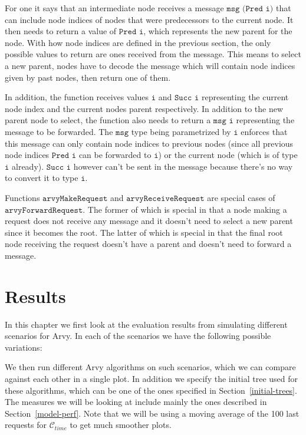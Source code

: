 \documentclass[a4paper, oneside]{discothesis}
\begin{document}
For one it says that an intermediate node receives a message $\texttt{msg (Pred i)}$ that can include node indices of nodes that were predecessors to the current node. It then needs to return a value of $\texttt{Pred i}$, which represents the new parent for the node. With how node indices are defined in the previous section, the only possible values to return are ones received from the message. This means to select a new parent, nodes have to decode the message which will contain node indices given by past nodes, then return one of them.

In addition, the function receives values $\texttt{i}$ and $\texttt{Succ i}$ representing the current node index and the current nodes parent respectively. In addition to the new parent node to select, the function also needs to return a $\texttt{msg i}$ representing the message to be forwarded. The $\texttt{msg}$ type being parametrized by $\texttt{i}$ enforces that this message can only contain node indices to previous nodes (since all previous node indices $\texttt{Pred i}$ can be forwarded to $\texttt{i}$) or the current node (which is of type $\texttt{i}$ already). $\texttt{Succ i}$ however can't be sent in the message because there's no way to convert it to type $\texttt{i}$.

Functions $\texttt{arvyMakeRequest}$ and $\texttt{arvyReceiveRequest}$ are special cases of $\texttt{arvyForwardRequest}$. The former of which is special in that a node making a request does not receive any message and it doesn't need to select a new parent since it becomes the root. The latter of which is special in that the final root node receiving the request doesn't have a parent and doesn't need to forward a message.

\chapter{Results}

In this chapter we first look at the evaluation results from simulating different scenarios for Arvy. In each of the scenarios we have the following possible variations:

We then run different Arvy algorithms on such scenarios, which we can compare against each other in a single plot. In addition we specify the initial tree used for these algorithms, which can be one of the ones specified in Section~\ref{initial-trees}. The measures we will be looking at include mainly the ones described in Section~\ref{model-perf}. Note that we will be using a moving average of the 100 last requests for $\mathcal{C}_{time}$ to get much smoother plots.
\end{document}
